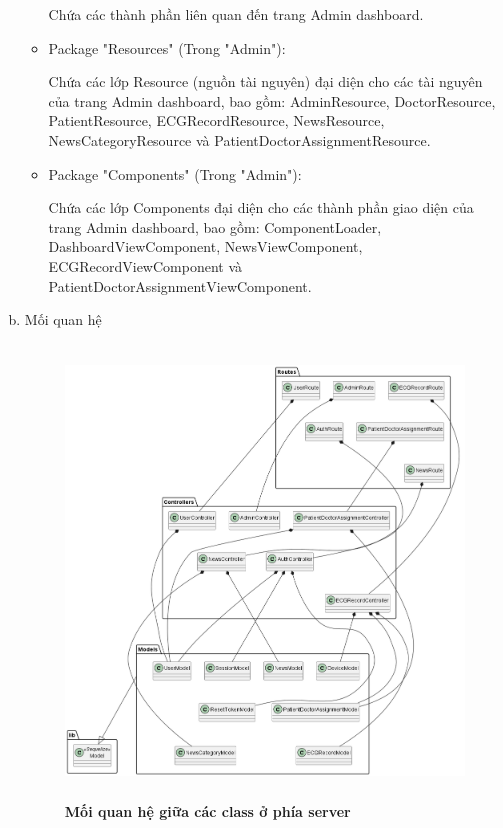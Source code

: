 \begin{enumerate}[a)]
\begin{itemize}
  Chứa các thành phần liên quan đến trang Admin dashboard.
  \item Package "Resources" (Trong "Admin"):
  
  Chứa các lớp Resource (nguồn tài nguyên) đại diện cho các tài nguyên của trang Admin dashboard, bao gồm: AdminResource, DoctorResource, PatientResource, ECGRecordResource, NewsResource, NewsCategoryResource và PatientDoctorAssignmentResource.
  \item Package "Components" (Trong "Admin"):
  
  Chứa các lớp Components đại diện cho các thành phần giao diện của trang Admin dashboard, bao gồm: ComponentLoader, DashboardViewComponent, NewsViewComponent, ECGRecordViewComponent và PatientDoctorAssignmentViewComponent.
\end{itemize}



\item Mối quan hệ

\begin{figure}[H]
  \centering
  \includegraphics[width=15cm,height=12cm]{Images/server/class/class_relation.png}
  \caption[Mối quan hệ giữa các class ở phía server]{\bfseries \fontsize{12pt}{0pt}\selectfont Mối quan hệ giữa các class ở phía server}
  \label{class_relation} %
\end{figure}



\end{enumerate}
